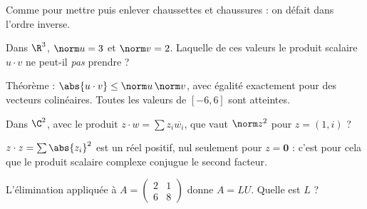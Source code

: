 \begin{qcm}
\begin{question}
\begin{explication}
Comme pour mettre puis enlever chaussettes et chaussures : on défait dans l'ordre inverse.
\end{explication}
\end{question}
\begin{question}
Dans $\R^3$, $\norm u=3$ et $\norm v=2$. Laquelle de ces valeurs le produit scalaire $u\cdot v$ ne peut-il \emph{pas} prendre ?
\begin{explication}
Théorème  : $\abs{u\cdot v}\le\norm u\,\norm v$, avec égalité exactement pour des vecteurs colinéaires. Toutes les valeurs de $[-6,6]$ sont atteintes.
\end{explication}
\end{question}
\begin{question}
Dans $\C^2$, avec le produit $z\cdot w=\sum z_i\overline{w_i}$, que vaut $\norm z^2$ pour $z=(1,i)$ ?
\begin{explication}
$z\cdot z=\sum\abs{z_i}^2$ est un réel positif, nul seulement pour $z=\mathbf 0$ : c'est pour cela que le produit scalaire complexe conjugue le second facteur.
\end{explication}
\end{question}
\begin{question}
L'élimination appliquée à $A=\begin{pmatrix}2&1\\6&8\end{pmatrix}$ donne $A=LU$. Quelle est $L$ ?

\end{question}
\end{qcm}
